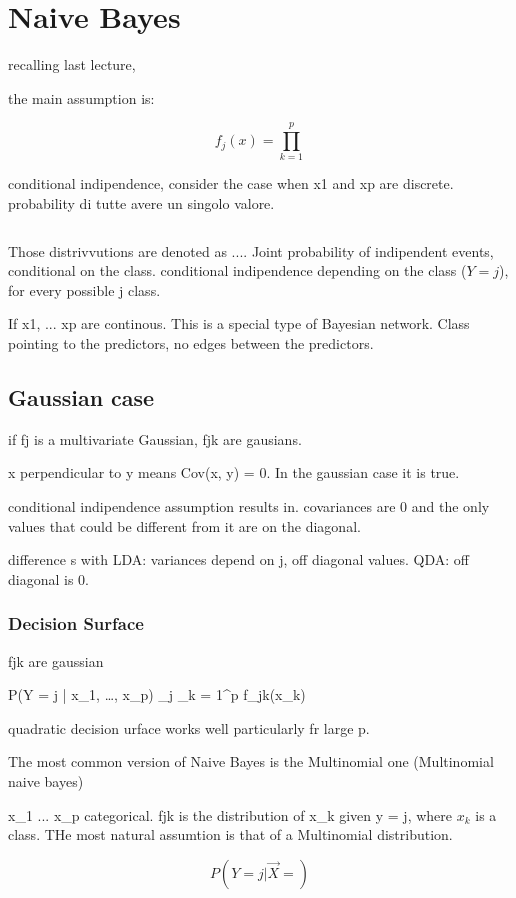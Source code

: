\graphicspath{{chapters/images/0/}}

\section{Naive Bayes}
recalling last lecture, 

the main assumption is:

$$f_j(x) = \prod_{k = 1}^p$$

conditional indipendence,
consider the case when x1 and xp are discrete. probability di tutte avere un singolo valore.

$$ $$

Those distrivvutions are denoted as $ ... $. Joint probability of indipendent events, conditional on the class. conditional indipendence depending on the class ($ Y = j $), for every possible j class. 

If x1, ... xp are continous. This is a special type of Bayesian network. Class pointing to the predictors, no edges between the predictors.  

\subsection{Gaussian case}
if fj is a multivariate Gaussian, fjk are gausians. 

x perpendicular to y means Cov(x, y) = 0. In the gaussian case it is true. 

conditional indipendence assumption results in. covariances are 0 and the only values that could be different from it are on the diagonal.

difference s with LDA: variances depend on j, off diagonal values. QDA: off diagonal is 0.

\subsubsection{Decision Surface}
fjk are gaussian

P(Y = j | x_1, \dots, x_p) \alpha \pi_j \prod_{k = 1}^p f_{jk}(x_k)

quadratic decision urface works well particularly fr large p.

The most common version of Naive Bayes is the Multinomial one (Multinomial naive bayes)

x_1 ... x_p categorical. fjk is the distribution of x_k given y = j, where $x_k$ is a class. THe most natural assumtion is that of a Multinomial distribution.

$$ P(Y = j | \vec{X} = )$$

